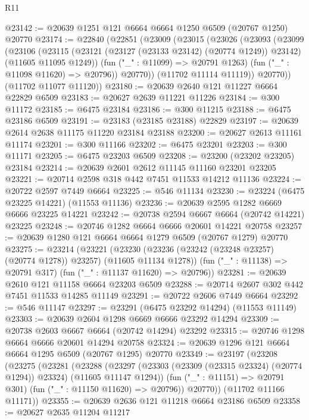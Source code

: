 \begin{lexlean}{R11}
\begin{coremodule}
@23142 := @20639 @1251 @121 @6664 @6664 @1250 @6509 (@20767 @1250) @20770
@23174 := @22840
    (@22851
      (@23009
        (@23015
          (@23026
            (@23093
              (@23099
                (@23106
                  (@23115
                    (@23121 (@23127 (@23133 @23142) (@20774 @1249)) @23142)
                    (@11605 @11095 @1249))
                  (fun ("_" : @11099) => @20791 @1263)
                  (fun ("_" : @11098 @11620) => @20796))
                @20770))
            (@11702 @11114 @11119))
          @20770))
      (@11702 @11077 @11120))
@23180 := @20639 @2640 @121 @11227 @6664 @22829 @6509
@23183 := @20627 @2639 @11221 @11226
@23184 := @300 @11172
@23185 := @6475 @23184
@23186 := @300 @11215
@23188 := @6475 @23186 @6509
@23191 := @23183 (@23185 @23188) @22829
@23197 := @20639 @2614 @2638 @11175 @11220 @23184 @23188
@23200 := @20627 @2613 @11161 @11174
@23201 := @300 @11166
@23202 := @6475 @23201
@23203 := @300 @11171
@23205 := @6475 @23203 @6509
@23208 := @23200 (@23202 @23205) @23184
@23214 := @20639 @2601 @2612 @11145 @11160 @23201 @23205
@23221 := @20714 @2598 @318 @442 @7451 @11533 @14212 @11136
@23224 := @20722 @2597 @7449 @6664
@23225 := @546 @11134
@23230 := @23224 (@6475 @23225 @14221) (@11553 @11136)
@23236 := @20639 @2595 @1282 @6669 @6666 @23225 @14221
@23242 := @20738 @2594 @6667 @6664 (@20742 @14221) @23225
@23248 := @20746 @1282 @6664 @6666 @20601 @14221 @20758
@23257 := @20639 @1280 @121 @6664 @6664 @1279 @6509 (@20767 @1279) @20770
@23275 := @23214
    (@23221
      (@23230 (@23236 (@23242 (@23248 @23257) (@20774 @1278)) @23257) (@11605 @11134 @1278))
      (fun ("_" : @11138) => @20791 @317)
      (fun ("_" : @11137 @11620) => @20796))
@23281 := @20639 @2610 @121 @11158 @6664 @23203 @6509
@23288 := @20714 @2607 @302 @442 @7451 @11533 @14285 @11149
@23291 := @20722 @2606 @7449 @6664
@23292 := @546 @11147
@23297 := @23291 (@6475 @23292 @14294) (@11553 @11149)
@23303 := @20639 @2604 @1298 @6669 @6666 @23292 @14294
@23309 := @20738 @2603 @6667 @6664 (@20742 @14294) @23292
@23315 := @20746 @1298 @6664 @6666 @20601 @14294 @20758
@23324 := @20639 @1296 @121 @6664 @6664 @1295 @6509 (@20767 @1295) @20770
@23349 := @23197
    (@23208
      (@23275
        (@23281
          (@23288
            (@23297 (@23303 (@23309 (@23315 @23324) (@20774 @1294)) @23324) (@11605 @11147 @1294))
            (fun ("_" : @11151) => @20791 @301)
            (fun ("_" : @11150 @11620) => @20796))
          @20770))
      (@11702 @11166 @11171))
@23355 := @20639 @2636 @121 @11218 @6664 @23186 @6509
@23358 := @20627 @2635 @11204 @11217

\end{coremodule}
\end{lexlean}
